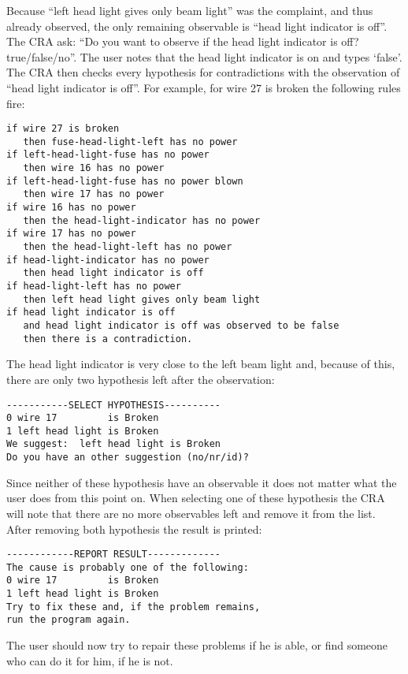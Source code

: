 Because ``left head light gives only beam light'' was the complaint, and thus already observed, the only remaining observable is ``head light indicator is off''. The CRA ask: ``Do you want to observe if the head light indicator is off? true/false/no''. The user notes that the head light indicator is on and types `false'. The CRA then checks every hypothesis for contradictions with the observation of ``head light indicator is off''. For example, for wire 27 is broken the following rules fire:

\begin{verbatim}
if wire 27 is broken 
   then fuse-head-light-left has no power
if left-head-light-fuse has no power 
   then wire 16 has no power
if left-head-light-fuse has no power blown 
   then wire 17 has no power
if wire 16 has no power 
   then the head-light-indicator has no power
if wire 17 has no power 
   then the head-light-left has no power
if head-light-indicator has no power 
   then head light indicator is off
if head-light-left has no power 
   then left head light gives only beam light
if head light indicator is off 
   and head light indicator is off was observed to be false
   then there is a contradiction.
\end{verbatim}

The head light indicator is very close to the left beam light and, because of this, there are only two hypothesis left after the observation:

\begin{verbatim}
-----------SELECT HYPOTHESIS----------
0 wire 17         is Broken
1 left head light is Broken
We suggest:  left head light is Broken
Do you have an other suggestion (no/nr/id)?
\end{verbatim}

Since neither of these hypothesis have an observable it does not matter what the user does from this point on. When selecting one of these hypothesis the CRA will note that there are no more observables left and remove it from the list. After removing both hypothesis the result is printed:

\begin{verbatim}
------------REPORT RESULT-------------
The cause is probably one of the following: 
0 wire 17         is Broken
1 left head light is Broken
Try to fix these and, if the problem remains, 
run the program again.
\end{verbatim}

The user should now try to repair these problems if he is able, or find someone who can do it for him, if he is not.